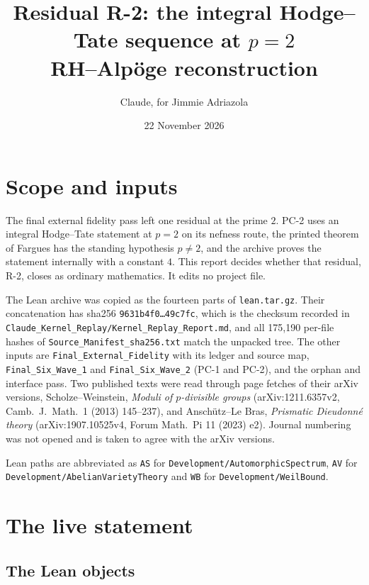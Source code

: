 \documentclass[11pt]{article}
\title{Residual R-2: the integral Hodge--Tate sequence at $p=2$\\[2pt]\large RH--Alpöge reconstruction}
\author{Claude, for Jimmie Adriazola}
\date{22 November 2026}
\theoremstyle{definition}
\theoremstyle{remark}
\begin{document}
\maketitle

\section{Scope and inputs}

The final external fidelity pass left one residual at the prime $2$. PC-2 uses an integral Hodge--Tate statement at $p=2$ on its nefness route, the printed theorem of Fargues has the standing hypothesis $p\ne2$, and the archive proves the statement internally with a constant $4$. This report decides whether that residual, R-2, closes as ordinary mathematics. It edits no project file.

The Lean archive was copied as the fourteen parts of \texttt{lean.tar.gz}. Their concatenation has sha256 \texttt{9631b4f0\dots49c7fc}, which is the checksum recorded in \texttt{Claude\_Kernel\_Replay/Kernel\_Replay\_Report.md}, and all 175{,}190 per-file hashes of \texttt{Source\_Manifest\_sha256.txt} match the unpacked tree. The other inputs are \texttt{Final\_External\_Fidelity} with its ledger and source map, \texttt{Final\_Six\_Wave\_1} and \texttt{Final\_Six\_Wave\_2} (PC-1 and PC-2), and the orphan and interface pass. Two published texts were read through page fetches of their arXiv versions, Scholze--Weinstein, \emph{Moduli of $p$-divisible groups} (arXiv:1211.6357v2, Camb.\ J.\ Math.\ 1 (2013) 145--237), and Anschütz--Le Bras, \emph{Prismatic Dieudonné theory} (arXiv:1907.10525v4, Forum Math.\ Pi 11 (2023) e2). Journal numbering was not opened and is taken to agree with the arXiv versions.

Lean paths are abbreviated as \texttt{AS} for \texttt{Development/AutomorphicSpectrum}, \texttt{AV} for \texttt{Development/AbelianVarietyTheory} and \texttt{WB} for \texttt{Development/WeilBound}.

\section{The live statement}\label{sec:live}

\subsection{The Lean objects}
\end{document}
